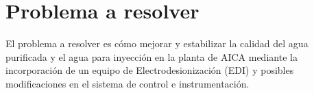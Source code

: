 \section*{Problema a resolver}
El problema a resolver es cómo mejorar y estabilizar la calidad del agua purificada y el agua para inyección en la planta de AICA mediante la incorporación de un equipo de Electrodesionización (EDI) y posibles modificaciones en el sistema de control e instrumentación.